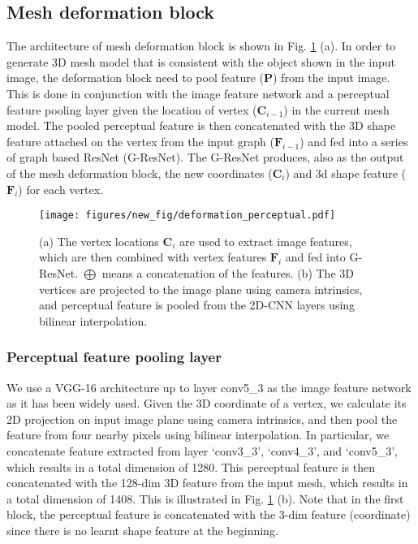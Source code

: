 \documentclass[runningheads]{llncs}
\def\bfC{\mathbf{C}}
\def\bfF{\mathbf{F}}
\def\bfP{\mathbf{P}}
\newcommand{\figref}[1]{Fig. \ref{#1}}
\begin{document}
\subsection{Mesh deformation block}
\label{sec:cmrn}
The architecture of mesh deformation block is shown in \figref{fig:block} (a).
In order to generate 3D mesh model that is consistent with the object shown in the input image, the deformation block need to pool feature ($\bfP$) from the input image. This is done in conjunction with the image feature network and a perceptual feature pooling layer given the location of vertex ($\bfC_{i-1}$) in the current mesh model.
The pooled perceptual feature is then concatenated with the 3D shape feature attached on the vertex from the input graph ($\bfF_{i-1}$) and fed into a series of graph based ResNet (G-ResNet).
The G-ResNet produces, also as the output of the mesh deformation block, the new coordinates ($\bfC_i$) and 3d shape feature ($\bfF_i$) for each vertex.

\begin{figure}[t]
\centering
\texttt{[image: figures/new\_fig/deformation\_perceptual.pdf]}
\caption{(a) The vertex locations $\bfC_i$ are used to extract image features, which are then combined with vertex features $\bfF_i$ and fed into G-ResNet. $\bigoplus$ means a concatenation of the features. (b) The 3D vertices are projected to the image plane using camera intrinsics, and perceptual feature is pooled from the 2D-CNN layers using bilinear interpolation.}
\label{fig:block}
\end{figure}

\subsubsection{Perceptual feature pooling layer}
We use a VGG-16 architecture up to layer conv5\_3 as the image feature network as it has been widely used.
Given the 3D coordinate of a vertex, we calculate its 2D projection on input image plane using camera intrinsics, and then pool the feature from four nearby pixels using bilinear interpolation. In particular, we concatenate feature extracted from layer `conv3\_3', `conv4\_3', and `conv5\_3', which results in a total dimension of 1280.
This perceptual feature is then concatenated with the 128-dim 3D feature from the input mesh, which results in a total dimension of 1408. This is illustrated in \figref{fig:block} (b). Note that in the first block, the perceptual feature is concatenated with the 3-dim feature (coordinate) since there is no learnt shape feature at the beginning.
\end{document}
